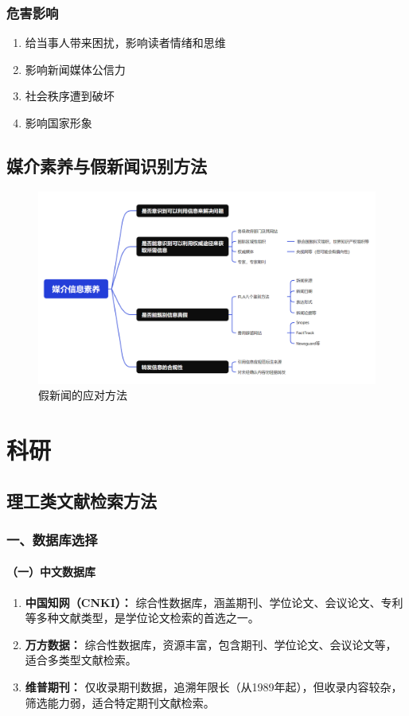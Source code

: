\subsubsection{危害影响}
\begin{enumerate}
  \item 给当事人带来困扰，影响读者情绪和思维
  \item 影响新闻媒体公信力
  \item 社会秩序遭到破坏
  \item 影响国家形象
\end{enumerate}
\subsection{媒介素养与假新闻识别方法}
\begin{figure}[H]
  \centering
  \includegraphics[width=\textwidth]{./figures/假新闻/思维导图.png}
  \caption{假新闻的应对方法}
\end{figure}
\section{科研}
\subsection{理工类文献检索方法}\label{数据库}
\subsubsection*{一、数据库选择}

\paragraph{（一）中文数据库}

\begin{enumerate}
  \item \textbf{中国知网（CNKI）：} 综合性数据库，涵盖期刊、学位论文、会议论文、专利等多种文献类型，是学位论文检索的首选之一。
  \item \textbf{万方数据：} 综合性数据库，资源丰富，包含期刊、学位论文、会议论文等，适合多类型文献检索。
  \item \textbf{维普期刊：} 仅收录期刊数据，追溯年限长（从1989年起），但收录内容较杂，筛选能力弱，适合特定期刊文献检索。
\end{enumerate}

